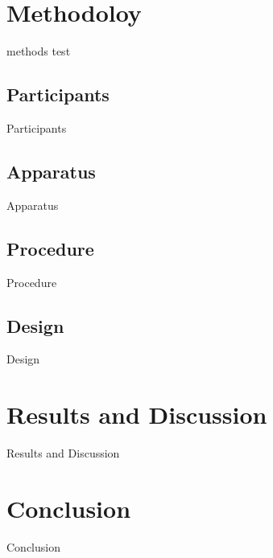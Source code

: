 \documentclass[sigconf]{acmart}
\begin{document}
\section{Methodoloy}
methods
test\cite{AudioDistractionsAshley}

\subsection[short]{Participants}
Participants

\subsection[short]{Apparatus}
Apparatus

\subsection[short]{Procedure}
Procedure

\subsection[short]{Design}
Design

\section{Results and Discussion}
Results and Discussion

\section{Conclusion}
Conclusion




\end{document}

